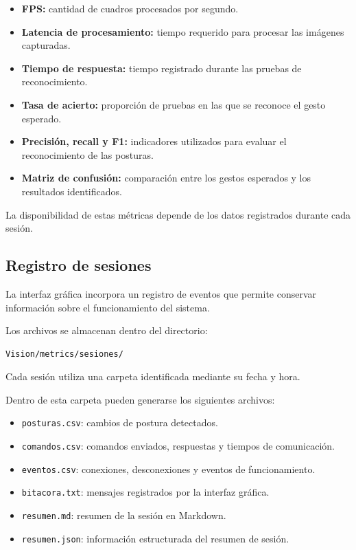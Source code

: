 \documentclass[letterpaper,journal]{IEEEtran}
\begin{document}
\begin{itemize}
    \item \textbf{FPS:} cantidad de cuadros
    procesados por segundo.

    \item \textbf{Latencia de procesamiento:}
    tiempo requerido para procesar
    las imágenes capturadas.

    \item \textbf{Tiempo de respuesta:}
    tiempo registrado durante las
    pruebas de reconocimiento.

    \item \textbf{Tasa de acierto:}
    proporción de pruebas en las
    que se reconoce el gesto esperado.

    \item \textbf{Precisión, recall y F1:}
    indicadores utilizados para evaluar
    el reconocimiento de las posturas.

    \item \textbf{Matriz de confusión:}
    comparación entre los gestos esperados
    y los resultados identificados.
\end{itemize}

La disponibilidad de estas métricas
depende de los datos registrados
durante cada sesión.

\subsection{Registro de sesiones}

La interfaz gráfica incorpora un
registro de eventos que permite
conservar información sobre el
funcionamiento del sistema.

Los archivos se almacenan dentro
del directorio:

\begin{verbatim}
Vision/metrics/sesiones/
\end{verbatim}

Cada sesión utiliza una carpeta
identificada mediante su fecha y hora.

Dentro de esta carpeta pueden
generarse los siguientes archivos:

\begin{itemize}
    \item \texttt{posturas.csv}:
    cambios de postura detectados.

    \item \texttt{comandos.csv}:
    comandos enviados, respuestas
    y tiempos de comunicación.

    \item \texttt{eventos.csv}:
    conexiones, desconexiones
    y eventos de funcionamiento.

    \item \texttt{bitacora.txt}:
    mensajes registrados por
    la interfaz gráfica.

    \item \texttt{resumen.md}:
    resumen de la sesión en Markdown.

    \item \texttt{resumen.json}:
    información estructurada
    del resumen de sesión.
\end{itemize}
\end{document}
